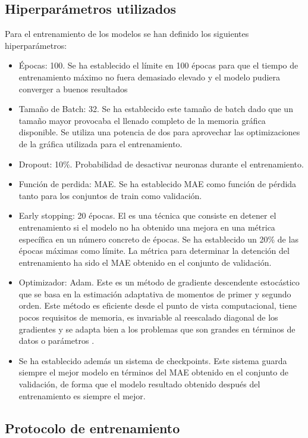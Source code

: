 \subsection{Hiperparámetros utilizados}
Para el entrenamiento de los modelos se han definido los siguientes hiperparámetros:
\begin{itemize}
    \item Épocas: 100. Se ha establecido el límite en 100 épocas para que el tiempo de entrenamiento máximo no fuera demasiado elevado y el modelo pudiera converger a buenos resultados
    \item Tamaño de Batch: 32. Se ha establecido este tamaño de batch dado que un tamaño mayor provocaba el llenado completo de la memoria gráfica disponible. Se utiliza una potencia de dos para aprovechar las optimizaciones de la gráfica utilizada para el entrenamiento.
    \item Dropout: 10\%. Probabilidad de desactivar neuronas durante el entrenamiento.
    \item Función de perdida: MAE. Se ha establecido MAE como función de pérdida tanto para los conjuntos de train como validación.
    \item Early stopping: 20 épocas. El  es una técnica que consiste en detener el entrenamiento si el modelo no ha obtenido una mejora en una métrica específica en un número concreto de épocas. Se ha establecido un 20\% de las épocas máximas como límite. La métrica para determinar la detención del entrenamiento ha sido el MAE obtenido en el conjunto de validación.
    \item Optimizador: Adam. Este es un método de gradiente descendente estocástico que se basa en la estimación adaptativa de momentos de primer y segundo orden. Este método es eficiente desde el punto de vista computacional, tiene pocos requisitos de memoria, es invariable al reescalado diagonal de los gradientes y se adapta bien a los problemas que son grandes en términos de datos o parámetros \cite{kingma2014adam}.
    \item Se ha establecido además un sistema de checkpoints. Este sistema guarda siempre el mejor modelo en términos del MAE obtenido en el conjunto de validación, de forma que el modelo resultado obtenido después del entrenamiento es siempre el mejor.
\end{itemize}

\subsection{Protocolo de entrenamiento}

